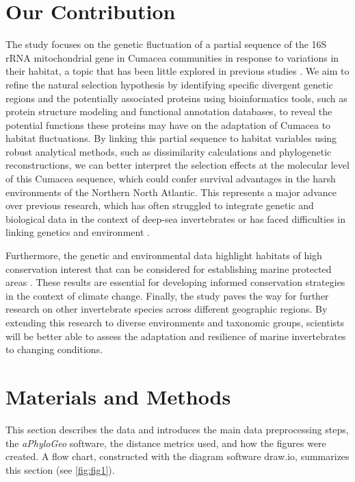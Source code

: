 \section{Our Contribution}\label{contribution}
The study focuses on the genetic fluctuation of a partial sequence of the 16S rRNA mitochondrial gene in Cumacea communities in response to variations in their habitat, a topic that has been little explored in previous studies \citep{grassle1992deep, rex2000latitudinal}. We aim to refine the natural selection hypothesis by identifying specific divergent genetic regions and the potentially associated proteins using bioinformatics tools, such as protein structure modeling and functional annotation databases, to reveal the potential functions these proteins may have on the adaptation of Cumacea to habitat fluctuations. By linking this partial sequence to habitat variables using robust analytical methods, such as dissimilarity calculations and phylogenetic reconstructions, we can better interpret the selection effects at the molecular level of this Cumacea sequence, which could confer survival advantages in the harsh environments of the Northern North Atlantic. This represents a major advance over previous research, which has often struggled to integrate genetic and biological data in the context of deep-sea invertebrates \citep{etter1990population, vrijenhoek2009cryptic} or has faced difficulties in linking genetics and environment \citep{manel2003landscape, balkenhol2009statistical}.

Furthermore, the genetic and environmental data highlight habitats of high conservation interest that can be considered for establishing marine protected areas \citep{levin2009ecological}. These results are essential for developing informed conservation strategies in the context of climate change. Finally, the study paves the way for further research on other invertebrate species across different geographic regions. By extending this research to diverse environments and taxonomic groups, scientists will be better able to assess the adaptation and resilience of marine invertebrates to changing conditions.

\section{Materials and Methods}\label{materials-methods}
This section describes the data and introduces the main data preprocessing steps, the \textit{aPhyloGeo} software, the distance metrics used, and how the figures were created. A flow chart, constructed with the diagram software draw.io, summarizes this section (see \autoref{fig:fig1}).


